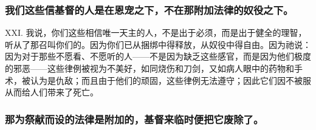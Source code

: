 
\subsubsection{我们这些信基督的人是在恩宠之下，不在那附加法律的奴役之下。}

XXI. 我说，你们这些相信唯一天主的人，不是出于必须，而是出于健全的理智，听从了那召叫你们的。因为你们已从捆绑中得释放，从奴役中得自由。因为祂说：因为对于那些不愿看、不愿听的人——不是因为缺乏这些感官，而是因为他们极度的邪恶——这些律例被视为不美好，如同烧伤和刀剑，又如病人眼中的药物和手术，被认为是仇敌；而且由于他们的顽固，这些律例无法遵守；因此它们因不被服从而给人们带来了死亡。\par


\subsubsection{那为祭献而设的法律是附加的，基督来临时便把它废除了。}

